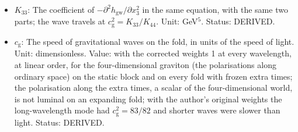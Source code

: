 \documentclass[
  10pt,
]{article}
\begin{document}
\begin{itemize}
  transverse traceless gravitational wave in the bulk at the static
  block, in units of its value with Einstein gravity alone:
  \(c_{\mathrm{t}} = 1 - 40w_{(2)} + 360w_{(3)}\) (FE-68). Unit:
  dimensionless. Value: 0 with the corrected weights; \(1/16\) with the
  author's original weights. Status: DERIVED.
\item
  \(K_{33}\): The coefficient of
  \(-\partial^2h_{\mathrm{gw}}/\partial x_3^2\) in the same equation,
  with the same two parts; the wave travels at
  \(c_{\mathrm{g}}^2 = K_{33}/K_{44}\). Unit: GeV\(^5\). Status:
  DERIVED.
\item
  \(c_{\mathrm{g}}\): The speed of gravitational waves on the fold, in
  units of the speed of light. Unit: dimensionless. Value: with the
  corrected weights 1 at every wavelength, at linear order, for the
  four-dimensional graviton (the polarisations along ordinary space) on
  the static block and on every fold with frozen extra times; the
  polarisation along the extra times, a scalar of the four-dimensional
  world, is not luminal on an expanding fold; with the author's original
  weights the long-wavelength mode had \(c_{\mathrm{g}}^2 = 83/82\) and
  shorter waves were slower than light. Status: DERIVED.
\end{itemize}
\end{document}
